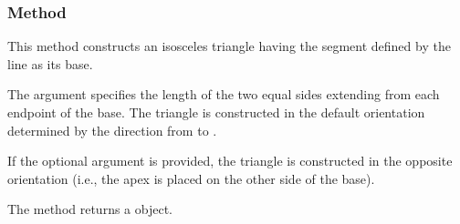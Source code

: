 \vspace{1em}
\begin{minipage}{.5\textwidth}
  \begin{center}
  \end{center}
\end{minipage}
\begin{minipage}{.5\textwidth}
\begin{tkzexample}
\end{tkzexample}
\end{minipage}


\subsubsection{Method } %
\label{ssub:method_line_isosceles}

This method constructs an isosceles triangle having the segment defined by the line as its base.

\medskip
\noindent
The argument  specifies the length of the two equal sides extending from each endpoint of the base. The triangle is constructed in the default orientation determined by the direction from  to .

\medskip
\noindent
If the optional argument  is provided, the triangle is constructed in the opposite orientation (i.e., the apex is placed on the other side of the base).

\medskip
\noindent
The method returns a  object.

